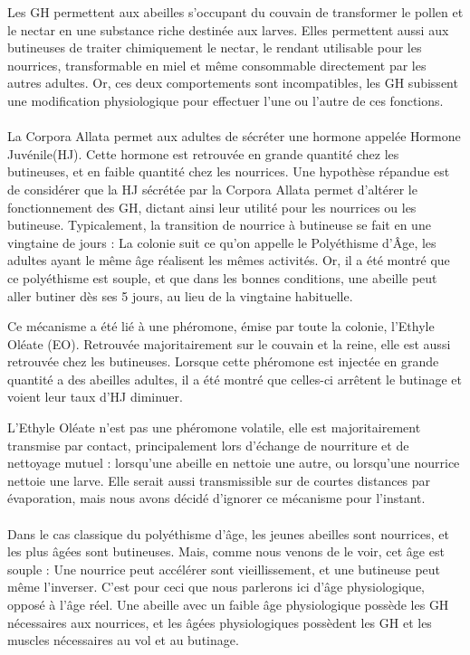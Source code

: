 \documentclass[11pt,a4paper]{report}
\begin{document}
			Les GH permettent aux abeilles s'occupant du couvain de transformer le pollen et le nectar en une substance riche destinée aux larves. Elles permettent aussi aux butineuses de traiter chimiquement le nectar, le rendant utilisable pour les nourrices, transformable en miel et même consommable directement par les autres adultes. Or, ces deux comportements sont incompatibles, les GH subissent une modification physiologique pour effectuer l'une ou l'autre de ces fonctions.
			
			\paragraph{}
			La Corpora Allata permet aux adultes de sécréter une hormone appelée Hormone Juvénile(HJ). Cette hormone est retrouvée en grande quantité chez les butineuses, et en faible quantité chez les nourrices. Une hypothèse répandue est de considérer que la HJ sécrétée par la Corpora Allata permet d'altérer le fonctionnement des GH, dictant ainsi leur utilité pour les nourrices ou les butineuse. Typicalement, la transition de nourrice à butineuse se fait en une vingtaine de jours : La colonie suit ce qu'on appelle le Polyéthisme d'Âge, les adultes ayant le même âge réalisent les mêmes activités. Or, il a été montré que ce polyéthisme est souple, et que dans les bonnes conditions, une abeille peut aller butiner dès ses 5 jours, au lieu de la vingtaine habituelle.
			
			Ce mécanisme a été lié à une phéromone, émise par toute la colonie, l'Ethyle Oléate (EO). Retrouvée majoritairement sur le couvain et la reine, elle est aussi retrouvée chez les butineuses. Lorsque cette phéromone est injectée en grande quantité a des abeilles adultes, il a été montré que celles-ci arrêtent le butinage et voient leur taux d'HJ diminuer.
			
			L'Ethyle Oléate n'est pas une phéromone volatile, elle est majoritairement transmise par contact, principalement lors d'échange de nourriture et de nettoyage mutuel : lorsqu'une abeille en nettoie une autre, ou lorsqu'une nourrice nettoie une larve. Elle serait aussi transmissible sur de courtes distances par évaporation, mais nous avons décidé d'ignorer ce mécanisme pour l'instant.
			
			
			\paragraph{}
			Dans le cas classique du polyéthisme d'âge, les jeunes abeilles sont nourrices, et les plus âgées sont butineuses. Mais, comme nous venons de le voir, cet âge est souple : Une nourrice peut accélérer sont vieillissement, et une butineuse peut même l'inverser. C'est pour ceci que nous parlerons ici d'âge physiologique, opposé à l'âge réel. Une abeille avec un faible âge physiologique possède les GH nécessaires aux nourrices, et les âgées physiologiques possèdent les GH et les muscles nécessaires au vol et au butinage. 
			
\end{document}
